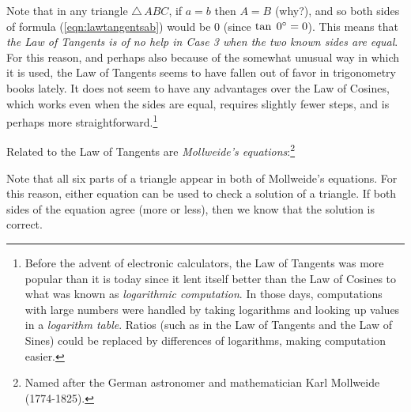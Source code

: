 \divider\vspace{-2mm}
\newpage
Note that in any triangle $\triangle\,ABC$, if $a = b$ then $A = B$ (why?), and so both sides of
formula (\ref{eqn:lawtangentsab}) would be $0$ (since $\tan\;0^\circ = 0$). This means that
\emph{the Law of Tangents is of no help in Case 3 when the two known sides are equal}. For this
reason, and
perhaps also because of the somewhat unusual way in which it is used, the Law of Tangents seems to
have fallen out of favor in trigonometry books lately. It does not seem to have any advantages over
the Law of Cosines, which works even when the sides are equal, requires slightly fewer steps, and
is perhaps more straightforward.\footnote{Before the advent of electronic calculators, the Law of
Tangents was more popular than it is today
since it lent itself better than the Law of Cosines to what was known as
\emph{logarithmic computation}. In those days, computations with large numbers were handled by
taking logarithms and looking up values in a \emph{logarithm table}. Ratios (such as in the
Law of Tangents and the Law of Sines) could be replaced by differences of logarithms, making
computation easier.}

Related to the Law of Tangents are \emph{Mollweide's equations}:\footnote{Named after the German
astronomer and mathematician Karl Mollweide (1774-1825).}

\begin{center}\end{center}

Note that all six parts of a triangle appear in both of Mollweide's equations. For this reason,
either equation can be used to check a solution of a triangle. If both sides of the equation agree
(more or less), then we know that the solution is correct.

